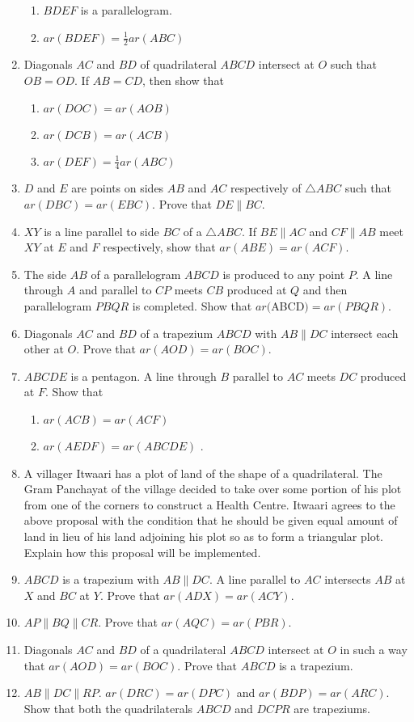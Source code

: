 \begin{enumerate}[label=\thesection.\arabic*.,ref=\thesection.\theenumi]
\begin{enumerate}
\item $BDEF$ is a parallelogram. 
\item $ar (BDEF) =
\frac{1}{ 2}
ar (ABC)$
\end{enumerate}
%
\item   Diagonals $AC$ and $BD$ of quadrilateral $ABCD$ intersect at $O$ such that $OB = OD$. If $AB = CD$, then show that 
\begin{enumerate}
\item $ar (DOC) = ar (AOB)$
 \item $ar (DCB) = ar (ACB)$
\item $ar (DEF) =
\frac{1}{ 4}
ar (ABC)$ 
\end{enumerate}
\item $D$ and $E$ are points on sides $AB$ and $AC$ respectively of $ \triangle  ABC$ such that $ar (DBC) = ar (EBC)$. Prove that $DE  \parallel  BC$.
\item $XY$ is a line parallel to side $BC$ of a $\triangle ABC$. If $BE  \parallel  AC$ and $CF  \parallel  AB$ meet $XY$ at $E$ and $F$ respectively, show that
$ar (ABE) = ar (ACF)$.
\item The side $AB$ of a parallelogram $ABCD$ is produced to any point $P$. A line through $A$ and parallel to $CP$ meets $CB$ produced at $Q$ and then parallelogram $PBQR$ is completed. Show that $ar ($ABCD$) = ar (PBQR)$. \item Diagonals $AC$ and $BD$ of a trapezium $ABCD$ with $AB  \parallel  DC$ intersect each other at $O$. Prove that $ar (AOD) = ar (BOC)$.
\item  $ABCDE$ is a pentagon. A line through $B$ parallel to $AC$ meets $DC$ produced at $F$. Show that 
\begin{enumerate}
\item $ar (ACB) = ar (ACF)$
 \item $ar (AEDF) = ar (ABCDE)$
. 
\end{enumerate}
\item A villager Itwaari has a plot of land of the shape of a quadrilateral. The Gram Panchayat of the village decided to take over some portion of his plot from one of the corners to construct a Health Centre. Itwaari agrees to the above proposal with the condition that he should be given equal amount of land in lieu of his land adjoining his plot so as to form a triangular plot. Explain how this proposal will be implemented.
\item $ABCD$ is a trapezium with $AB  \parallel  DC$. A line parallel to $AC$ intersects $AB$ at $X$ and $BC$ at $Y$. Prove that $ar (ADX) = ar (ACY)$.
\item  $AP  \parallel  BQ  \parallel  CR$. Prove that $ar (AQC) = ar (PBR)$.
\item Diagonals $AC$ and $BD$ of a quadrilateral $ABCD$ intersect at $O$ in such a way that $ar (AOD) = ar (BOC)$. Prove that $ABCD$ is a trapezium.
\item  $AB \parallel DC \parallel RP$.  $ar (DRC) = ar (DPC)$ and $ar (BDP) = ar (ARC)$. Show that both the quadrilaterals $ABCD$ and $DCPR$ are trapeziums.


\end{enumerate}
